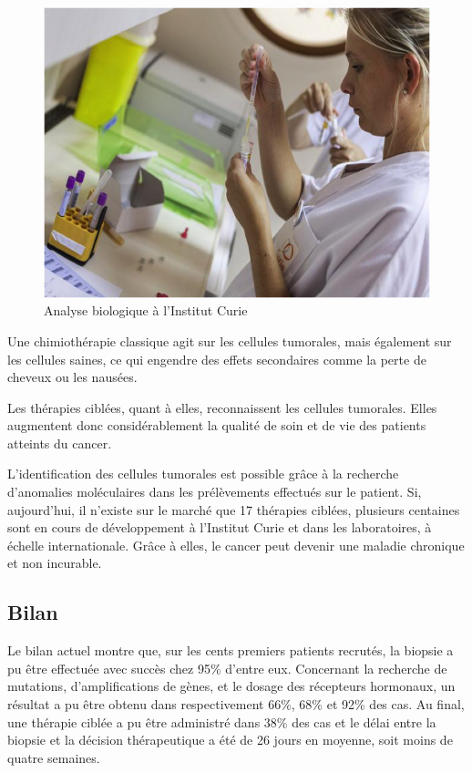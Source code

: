 \documentclass[12pt, openany]{report}
\begin{document}
 \begin{figure}[H]
\begin{center}
    \includegraphics[scale=0.8]{Images/im21.png}
\caption{Analyse biologique à l’Institut Curie}    
\end{center}
\end{figure}

Une chimiothérapie classique agit sur les cellules tumorales, mais également sur les cellules saines, ce qui engendre des effets secondaires comme la perte de cheveux ou les nausées. 

Les thérapies ciblées, quant à elles, reconnaissent les cellules tumorales. Elles augmentent donc considérablement la qualité de soin et de vie des patients atteints du cancer. 

L’identification des cellules tumorales est possible grâce à la recherche d’anomalies moléculaires dans les prélèvements effectués sur le patient. Si, aujourd’hui, il n’existe sur le marché que 17 thérapies ciblées, plusieurs centaines sont en cours de développement à l’Institut Curie et dans les laboratoires, à échelle internationale. Grâce à elles, le cancer peut devenir une maladie chronique et non incurable.

\subsection{Bilan}

Le bilan actuel montre que, sur les cents premiers patients recrutés, la biopsie a pu être effectuée avec succès chez 95\% d’entre eux. Concernant la recherche de mutations, d’amplifications de gènes, et le dosage des récepteurs hormonaux, un résultat a pu être obtenu dans respectivement 66\%, 68\% et 92\% des cas. Au final, une thérapie ciblée a pu être administré dans 38\% des cas et le délai entre la biopsie et la décision thérapeutique a été de 26 jours en moyenne, soit moins de quatre semaines.
\end{document}
